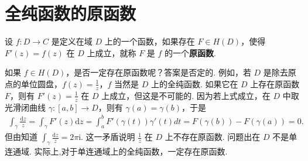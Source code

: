\documentclass[../../main.tex]{subfiles}
\begin{document}
\section{全纯函数的原函数}

\begin{definition}
设 \( f:D \to C \) 是定义在域 \( D \) 上的一个函数，如果存在 \( F \in H(D) \)，使得 \( F'(z) = f(z) \) 在 \( D \) 上成立，就称 \( F \) 是 \( f \) 的一个\textbf{原函数}.
\end{definition}

如果 \( f \in H(D) \)，是否一定存在原函数呢？答案是否定的. 例如，若 \( D \) 是除去原点的单位圆盘，\( f(z) = \frac{1}{z} \)，\( f \) 当然是 \( D \) 上的全纯函数. 如果它在 \( D \) 上存在原函数 \( F \)，则有 \( F'(z) = \frac{1}{z} \) 在 \( D \) 上成立，但这是不可能的. 因为若上式成立，在 \( D \) 中取光滑闭曲线 \( \gamma: [a,b] \to D \)，则有 \( \gamma(a) = \gamma(b) \)，于是
\begin{align*}
\int_{\gamma} \frac{\mathrm{d}z }{z} = \int_{\gamma} F'(z) \mathrm{d}z  = \int_{a}^{b} F'(\gamma(t)) \gamma'(t) dt = F(\gamma(b)) - F(\gamma(a)) = 0.
\end{align*}
但由知道 \( \int_{\gamma} \frac{\mathrm{d}z }{z} = 2\pi \mathrm{i} \). 这一矛盾说明 \( \frac{1}{z} \) 在 \( D \) 上不存在原函数. 问题出在 \( D \) 不是单连通域. 实际上,对于单连通域上的全纯函数，一定存在原函数.
\end{document}
